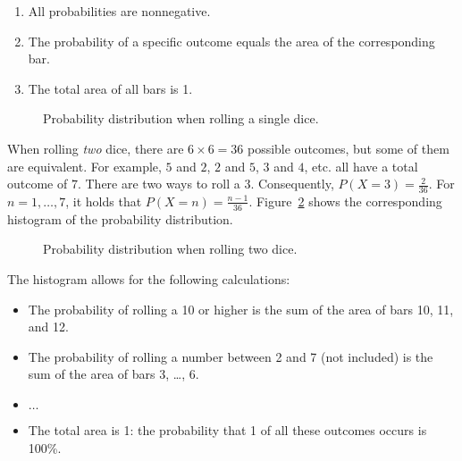 \begin{enumerate}
    \item All probabilities are nonnegative.
    \item The probability of a specific outcome equals the area of the corresponding bar.
    \item The total area of all bars is 1.
\end{enumerate}

\begin{figure}
    \centering
    \caption{Probability distribution when rolling a single dice.}
    \label{fig:probabilities-1-dice}
\end{figure}

When rolling \emph{two} dice, there are $6 \times 6 = 36$ possible outcomes, but some of them are equivalent. 
For example, $5$ and $2$, $2$ and $5$, $3$ and $4$, etc. all have a total outcome of $7$. 
There are two ways to roll a $3$. Consequently, $P(X=3) = \frac{2}{36}$. 
For $n = 1, \ldots, 7$, it holds that $P(X=n) = \frac{n-1}{36}$. 
Figure~\ref{fig:probabilities-2-dice} shows the corresponding histogram of the probability distribution.

\begin{figure}
    \centering
    \caption{Probability distribution when rolling two dice.}
    \label{fig:probabilities-2-dice}
  \end{figure}

The histogram allows for the following calculations:
\begin{itemize}
  \item The probability of rolling a 10 or higher is the sum of the area of bars 10, 11, and 12.
  \item The probability of rolling a number between 2 and 7 (not included) is the sum of the area of bars 3, \ldots, 6.
  \item $\ldots$
  \item The total area is 1: the probability that 1 of all these outcomes occurs is 100\%.
\end{itemize}

